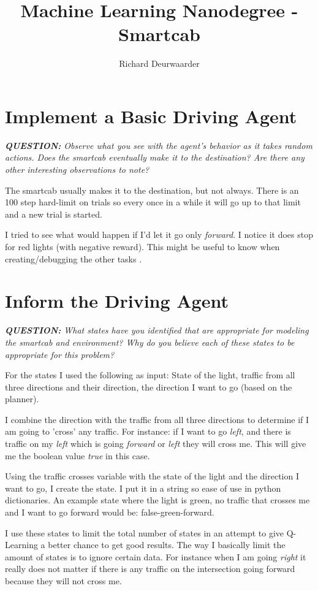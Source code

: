 \documentclass[11pt]{article}
\title{\textbf{Machine Learning Nanodegree - Smartcab}}
\author{Richard Deurwaarder}
\date{}
\begin{document}
\maketitle

\section{Implement a Basic Driving Agent}

\begin{center}
\textit{\textbf{QUESTION:} Observe what you see with the agent's behavior as it takes random actions. Does the smartcab eventually make it to the destination? Are there any other interesting observations to note?}
\end{center}

The smartcab usually makes it to the destination, but not always. There is an 100 step hard-limit on trials so every once in a while it will go up to that limit and a new trial is started.\par
I tried to see what would happen if I'd let it go only 	\textit{forward}. I notice it does stop for red lights (with negative reward). This might be useful to know when creating/debugging the other tasks .

\section{Inform the Driving Agent}
\begin{center}
\textit{\textbf{QUESTION:} What states have you identified that are appropriate for modeling the smartcab and environment? Why do you believe each of these states to be appropriate for this problem?}
\end{center}

For the states I used the following as input: State of the light, traffic from all three directions and their direction, the direction I want to go (based on the planner).\par
I combine the direction with the traffic from all three directions to determine if I am going to 'cross' any traffic. For instance: if I want to go \textit{left}, and there is traffic on my \textit{left} which is going \textit{forward} or \textit{left} they will cross me. This will give me the boolean value \textit{true} in this case.\par

Using the traffic crosses variable with the state of the light and the direction I want to go, I create the state. I put it in a string so ease of use in python dictionaries. An example state where the light is green, no traffic that crosses me and I want to go forward would be: false-green-forward.\par
I use these states to limit the total number of states in an attempt to give Q-Learning a better chance to get good results. The way I basically limit the amount of states is to ignore certain data. For instance when I am going \textit{right} it really does not matter if there is any traffic on the intersection going forward because they will not cross me.
\end{document}
